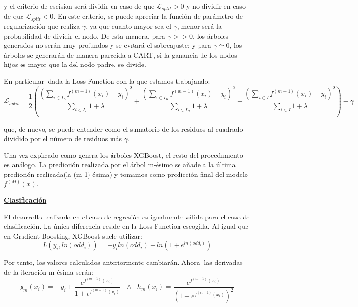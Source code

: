 \documentclass[12pt,twoside]{article}
\begin{document}
\noindent
y el criterio de escisión será dividir en caso de que $\mathcal{L}_{split} > 0$ y no dividir en caso de que $\mathcal{L}_{split} < 0$. En este criterio, se puede apreciar la función de parámetro de regularización que realiza $\gamma$, ya que cuanto mayor sea el $\gamma$, menor será la probabilidad de dividir el nodo. De esta manera, para $\gamma > > 0$, los árboles generados no serán muy profundos y se evitará el sobreajuste; y para $\gamma \simeq 0$, los árboles se generarán de manera parecida a CART, si la ganancia de los nodos hijos es mayor que la del nodo padre, se divide.

En particular, dada la Loss Function con la que estamos trabajando:
\begin{equation*}
\mathcal{L}_{split} = \frac{1}{2} \left( \frac{\left( \sum_{i \in I_L} f^{(m-1)}(x_i) - y_i \right)^2}{\sum_{i \in I_L} 1 + \lambda} + \frac{\left( \sum_{i \in I_R} f^{(m-1)}(x_i) - y_i \right)^2}{\sum_{i \in I_R} 1 + \lambda} + \frac{\left( \sum_{i \in I} f^{(m-1)}(x_i) - y_i \right)^2}{\sum_{i \in I} 1 + \lambda} \right)   - \gamma
\end{equation*}

\noindent
que, de nuevo, se puede entender como el sumatorio de los residuos al cuadrado dividido por el número de residuos más $\gamma$.

Una vez explicado como genera los árboles XGBoost, el resto del procedimiento es análogo. La predicción realizada por el árbol m-ésimo se añade a la última predicción realizada(la (m-1)-ésima) y tomamos como predicción final del modelo $f^(M)(x)$.



\bigskip \bigskip \bigskip

\textbf{\underline{Clasificación}}

El desarrollo realizado en el caso de regresión es igualmente válido para el caso de clasificación. La única diferencia reside en la Loss Function escogida. Al igual que en Gradient Boosting, XGBoost suele utilizar:
\begin{equation*}
L(y_i, ln(odd_i)) = -y_i ln(odd_i) + ln \left( 1 + e^{ln(odd_i)} \right)
\end{equation*}

Por tanto, los valores calculados anteriormente cambiarán. Ahora, las derivadas de la iteración m-ésima serán:
\begin{equation*}
g_m(x_i) = -y_i + \frac{e^{f^{(m-1)}(x_i)}}{1 + e^{f^{(m-1)}(x_i)}} \, \, \, \, \wedge \, \, \, \, h_m(x_i) = \frac{e^{f^{(m-1)}(x_i)}}{(1 + e^{f^{(m-1)}(x_i)})^2}
\end{equation*}
\end{document}
